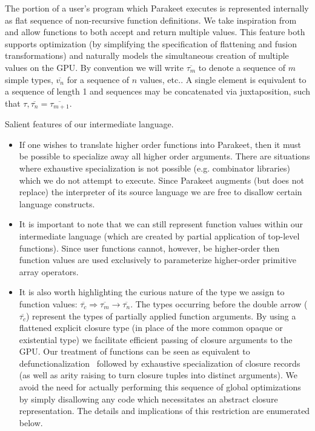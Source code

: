 \documentclass[preprint]{sigplanconf}
\begin{document}
The portion of a user's program which Parakeet executes is represented internally as flat sequence of non-recursive function definitions. 
We take inspiration from \cite{Bol09} and allow functions to both accept and return multiple values. This feature both supports optimization (by simplifying the specification of flattening and fusion transformations) and naturally models the simultaneous creation of multiple values on the GPU. By convention we will write $\overline{\tau_m}$ to denote a sequence of $m$ simple types, $\overline{v_n}$ for a sequence  of $n$ values, etc.. A single element is equivalent to a sequence of length 1 and sequences may be concatenated via juxtaposition, such that $\tau, \overline{\tau_n} = \overline{\tau_{m+1}}$. 

Salient features of our intermediate language. 
\begin{itemize}
\item If one wishes to translate higher order functions into Parakeet, then it must be possible to specialize away all higher order arguments. 
There are situations where exhaustive specialization is not possible (e.g. combinator libraries) which we do not attempt to execute. Since Parakeet augments (but does not replace) the interpreter of its source language we are free to disallow certain language constructs. 

\item It is important to note that we can still represent function values within our intermediate language (which are created by partial application of top-level functions). Since user functions cannot, however, be higher-order then function values are used exclusively to parameterize higher-order primitive array operators. 

\item It is also worth highlighting the curious nature of the type we assign to function values: $\overline{\tau_c} \Rightarrow \overline{\tau_m} \rightarrow \overline{\tau_n}$. The types occurring before the double arrow ($\overline{\tau_c}$) represent the types of partially applied function arguments. By using a flattened explicit closure type (in place of the more common opaque or existential type) we facilitate efficient passing of closure arguments to the GPU. Our treatment of functions can be seen as equivalent to defunctionalization~\cite{Reynolds} followed by exhaustive specialization of closure records (as well as arity raising to turn closure tuples into distinct arguments). We avoid the need for actually performing this sequence of global optimizations by simply disallowing any code which necessitates an abstract closure representation. The details and implications of this restriction are enumerated below. 
\end{itemize} 
\end{document}
